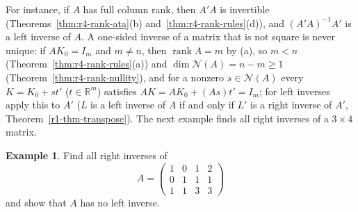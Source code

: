 \documentclass[12pt]{article}
\newcommand{\R}{\mathbb R}
\DeclareMathOperator{\rank}{rank}
\theoremstyle{definition}
\newtheorem{example}[theorem]{Example}
\begin{document}
For instance, if \(A\) has full column rank, then \(A'A\) is invertible
(Theorems~\ref{thm:r4-rank-ata}(b) and~\ref{thm:r4-rank-rules}(d)), and \((A'A)^{-1}A'\) is a left inverse of \(A\). A
one-sided inverse of a matrix that is not square is never unique: if \(AK_0=I_m\) and \(m\ne n\), then \(\rank A=m\) by (a),
so \(m<n\) (Theorem~\ref{thm:r4-rank-rules}(a)) and \(\dim\mathcal N(A)=n-m\geqslant1\) (Theorem~\ref{thm:r4-rank-nullity}), and for a nonzero \(s\in\mathcal N(A)\) every
\(K=K_0+st'\) (\(t\in\R^m\)) satisfies \(AK=AK_0+(As)t'=I_m\); for left inverses apply this to \(A'\) (\(L\) is a left
inverse of \(A\) if and only if \(L'\) is a right inverse of \(A'\), Theorem~\ref{r1-thm-transpose}). The next example
finds all right inverses of a \(3\times4\) matrix.

\begin{example}\label{exm:r4-one-sided}
Find all right inverses of
\[
A=\begin{pmatrix}1&0&1&2\\0&1&1&1\\1&1&3&3\end{pmatrix}
\]
and show that \(A\) has no left inverse.


\end{example}
\end{document}
